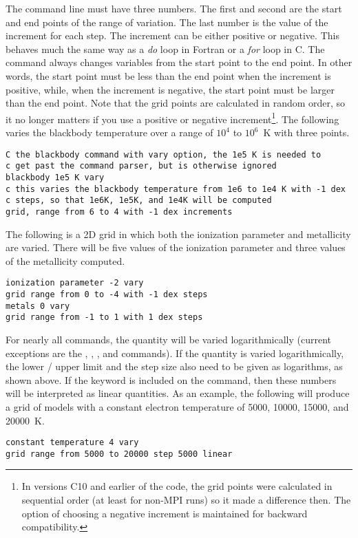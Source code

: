 The  command line must have three numbers.
The first and second
are the start and end points of the range of variation.
The last number
is the value of the increment for each step.
The increment can be either positive or negative.
This behaves much the same
way as a \emph{do} loop in Fortran or a \emph{for} loop in C.
The  command always changes variables from the start point
to the end point.
In other words, the start point must be less than the end point when
the increment is positive, while, when the increment is negative, the start
point must be larger than the end point. Note that the
grid points are calculated in random order, so it no longer
matters if you use a positive or negative increment\footnote{In versions
C10 and earlier of the code, the grid points were calculated in sequential
order (at least for non-MPI runs) so it made a difference then. The option of
choosing a negative increment is maintained for backward compatibility.}.
The following varies the
blackbody temperature over a range of $10^4$ to $10^6$~K with three points.
\begin{verbatim}
C the blackbody command with vary option, the 1e5 K is needed to
c get past the command parser, but is otherwise ignored
blackbody 1e5 K vary
c this varies the blackbody temperature from 1e6 to 1e4 K with -1 dex
c steps, so that 1e6K, 1e5K, and 1e4K will be computed
grid, range from 6 to 4 with -1 dex increments
\end{verbatim}
The following is a 2D grid in which both the ionization parameter and
metallicity are varied.
There will be five values of the ionization
parameter and three values of the metallicity computed.
\begin{verbatim}
ionization parameter -2 vary
grid range from 0 to -4 with -1 dex steps
metals 0 vary
grid range from -1 to 1 with 1 dex steps
\end{verbatim}

For nearly all commands, the quantity will be varied logarithmically (current
exceptions are the , ,
, and  commands). If the quantity is varied
logarithmically, the lower / upper limit and the step size also need to be
given as logarithms, as shown above. If the keyword  is
included on the  command, then these numbers will be
interpreted as linear quantities. As an example, the following will produce a
grid of models with a constant electron temperature of 5000, 10000, 15000, and
20000~K.
\begin{verbatim}
constant temperature 4 vary
grid range from 5000 to 20000 step 5000 linear
\end{verbatim}

